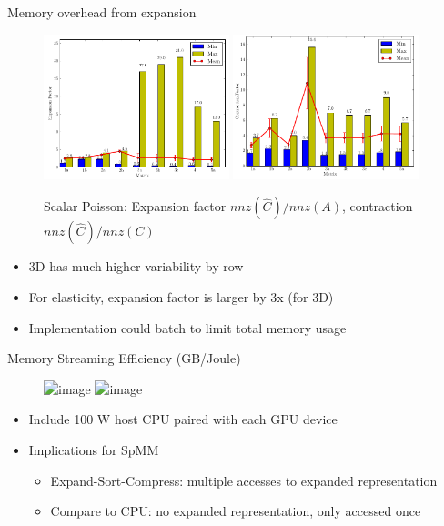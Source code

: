 \documentclass{beamer}
\begin{document}
\begin{frame}{Memory overhead from expansion}
  \begin{figure}
    \centering
    \includegraphics[width=0.48\textwidth]{figures/MG/SACUSPExpansionFactor} \quad
    \includegraphics[width=0.48\textwidth]{figures/MG/SACUSPContractionFactor}
    \caption{Scalar Poisson: Expansion factor $nnz(\hat C)/nnz(A)$, contraction $nnz(\hat C)/nnz(C)$}
  \end{figure}
  \vspace{-2em}
  \begin{itemize}
  \item 3D has much higher variability by row
  \item For elasticity, expansion factor is larger by 3x (for 3D)
  \item Implementation could batch to limit total memory usage
  \end{itemize}  
\end{frame}

\begin{frame}{Memory Streaming Efficiency (GB/Joule)}
  \begin{figure}
    \centering
    \includegraphics<1>[width=0.9\textwidth]{figures/hardware/mem-bandwidth-per-watt}
    \includegraphics<2->[width=0.9\textwidth]{figures/hardware/mem-bandwidth-per-watt-with-host}
  \end{figure}
  \begin{itemize}
  \item<2-> Include 100 W host CPU paired with each GPU device
  \item<3> Implications for SpMM
    \begin{itemize}
    \item Expand-Sort-Compress: multiple accesses to expanded representation
    \item Compare to CPU: no expanded representation, only accessed once
    \end{itemize}
  \end{itemize}
\end{frame}
\end{document}
